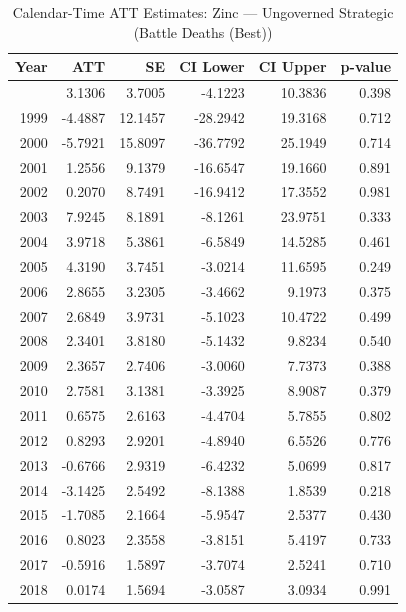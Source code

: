 \begin{longtable}{rrrrrr}
\caption{Calendar-Time ATT Estimates: Zinc --- Ungoverned Strategic (Battle Deaths (Best))} \label{tab:cal_zinc} \\
\toprule
\textbf{Year} & \textbf{ATT} & \textbf{SE} & \textbf{CI Lower} & \textbf{CI Upper} & \textbf{p-value} \\
\midrule
\endfirsthead
\bottomrule
\endlastfoot
1998 & 3.1306 & 3.7005 & -4.1223 & 10.3836 & 0.398 \\
1999 & -4.4887 & 12.1457 & -28.2942 & 19.3168 & 0.712 \\
2000 & -5.7921 & 15.8097 & -36.7792 & 25.1949 & 0.714 \\
2001 & 1.2556 & 9.1379 & -16.6547 & 19.1660 & 0.891 \\
2002 & 0.2070 & 8.7491 & -16.9412 & 17.3552 & 0.981 \\
2003 & 7.9245 & 8.1891 & -8.1261 & 23.9751 & 0.333 \\
2004 & 3.9718 & 5.3861 & -6.5849 & 14.5285 & 0.461 \\
2005 & 4.3190 & 3.7451 & -3.0214 & 11.6595 & 0.249 \\
2006 & 2.8655 & 3.2305 & -3.4662 & 9.1973 & 0.375 \\
2007 & 2.6849 & 3.9731 & -5.1023 & 10.4722 & 0.499 \\
2008 & 2.3401 & 3.8180 & -5.1432 & 9.8234 & 0.540 \\
2009 & 2.3657 & 2.7406 & -3.0060 & 7.7373 & 0.388 \\
2010 & 2.7581 & 3.1381 & -3.3925 & 8.9087 & 0.379 \\
2011 & 0.6575 & 2.6163 & -4.4704 & 5.7855 & 0.802 \\
2012 & 0.8293 & 2.9201 & -4.8940 & 6.5526 & 0.776 \\
2013 & -0.6766 & 2.9319 & -6.4232 & 5.0699 & 0.817 \\
2014 & -3.1425 & 2.5492 & -8.1388 & 1.8539 & 0.218 \\
2015 & -1.7085 & 2.1664 & -5.9547 & 2.5377 & 0.430 \\
2016 & 0.8023 & 2.3558 & -3.8151 & 5.4197 & 0.733 \\
2017 & -0.5916 & 1.5897 & -3.7074 & 2.5241 & 0.710 \\
2018 & 0.0174 & 1.5694 & -3.0587 & 3.0934 & 0.991 \\
\end{longtable}
